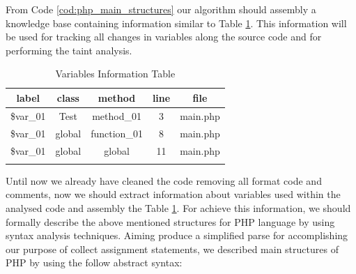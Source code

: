 From Code \ref{cod:php_main_structures} our algorithm should assembly a knowledge base containing information similar to Table \ref{tab:variables_table}. This information will be used for tracking all changes in variables along the source code and for performing the taint analysis.

\begin{table}[ht] 
\caption{Variables Information Table}
\centering
\begin{tabular}{c c c c c}
\hline\hline
label & class & method & line & file \\ [0.5ex]
\hline
\$var\_01 & Test & method\_01 & 3 & main.php \\
\$var\_01 & global & function\_01 & 8 & main.php \\
\$var\_01 & global & global & 11 & main.php \\
\hline
\label{tab:variables_table}
\end{tabular}
\end{table}

Until now we already have cleaned the code removing all format code and comments, now we should extract information about variables used within the analysed code and assembly the Table \ref{tab:variables_table}. For achieve this information, we should formally describe the above mentioned structures for PHP language by using syntax analysis techniques. Aiming produce a simplified parse for accomplishing our purpose of collect assignment statements, we described main structures of PHP by using the follow abstract syntax:

